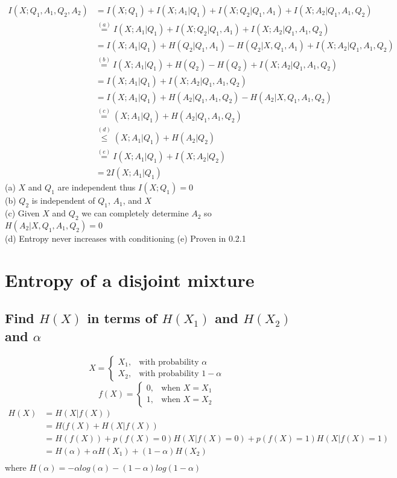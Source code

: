 \documentclass[11pt, oneside]{book}   	%
\begin{document}
\begin{equation}
\begin{split}
 I(X;Q_1,A_1,Q_2,A_2) & = I(X;Q_1) + I(X;A_1|Q_1) + I(X;Q_2|Q_1,A_1) + I(X;A_2|Q_1, A_1, Q_2)\\
 & \overset{(a)}{=} I(X;A_1|Q_1) + I(X;Q_2|Q_1,A_1) + I(X;A_2|Q_1, A_1, Q_2)\\
 & = I(X;A_1|Q_1) + H(Q_2|Q_1,A_1) - H(Q_2|X,Q_1,A_1) + I(X;A_2|Q_1, A_1, Q_2)\\
 & \overset{(b)}{=} I(X;A_1|Q_1) + H(Q_2) - H(Q_2) + I(X;A_2|Q_1, A_1, Q_2)\\
 & = I(X;A_1|Q_1) + I(X;A_2|Q_1, A_1, Q_2)\\
 & = I(X;A_1|Q_1) + H(A_2|Q_1,A_1,Q_2) - H(A_2|X,Q_1,A_1,Q_2)\\
 & \overset{(c)}{=} (X;A_1|Q_1) + H(A_2|Q_1,A_1,Q_2)\\
 & \overset{(d)}{\leq} (X;A_1|Q_1) + H(A_2|Q_2)\\
 & \overset{(e)}{=} I(X;A_1|Q_1)+I(X;A_2|Q_2)\\
 & = 2I(X;A_1|Q_1)
\end{split}
\end{equation}
(a) $X$ and $Q_1$ are independent thus $I(X;Q_1)=0$\\
(b) $Q_2$ is independent of $Q_1$, $A_1$, and $X$\\
(c) Given $X$ and $Q_2$ we can completely determine $A_2$ so $H(A_2|X,Q_1,A_1,Q_2) = 0$\\
(d) Entropy never increases with conditioning
(e) Proven in 0.2.1

\section{Entropy of a disjoint mixture}
\subsection{Find $H(X)$ in terms of $H(X_1)$ and $H(X_2)$ and $\alpha$}

\[
    X= 
\begin{cases}
    X_1, & \text{with probability } \alpha\\
    X_2, & \text{with probability } 1-\alpha
\end{cases}
\]
\[
    f(X)= 
\begin{cases}
    0, & \text{when } X=X_1\\
    1, & \text{when } X=X_2
\end{cases}
\]
\begin{equation}
\begin{split}
 H(X) & = H(X|f(X))\\
 & = H(f(X) + H(X|f(X))\\
 & = H(f(X)) + p(f(X)=0)H(X|f(X)=0) +p(f(X)=1)H(X|f(X)=1)\\
 & = H(\alpha) + \alpha H(X_1) + (1-\alpha)H(X_2)\\
\end{split}
\end{equation}
where $H(\alpha) = -\alpha log( \alpha) - (1-\alpha)log(1-\alpha)$
\end{document}
